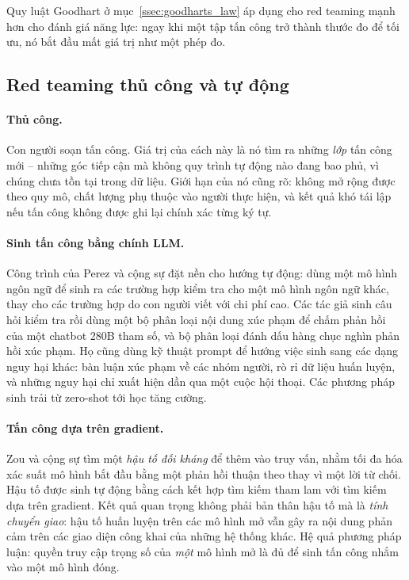 Quy luật Goodhart ở mục~\ref{ssec:goodharts_law} áp dụng cho red teaming mạnh hơn cho đánh giá năng lực: ngay khi một tập tấn công trở thành thước đo để tối ưu, nó bắt đầu mất giá trị như một phép đo.

\subsection{Red teaming thủ công và tự động}
\label{ssec:manual_auto_redteam}

\paragraph{Thủ công.} Con người soạn tấn công. Giá trị của cách này là nó tìm ra những \emph{lớp} tấn công mới -- những góc tiếp cận mà không quy trình tự động nào đang bao phủ, vì chúng chưa tồn tại trong dữ liệu. Giới hạn của nó cũng rõ: không mở rộng được theo quy mô, chất lượng phụ thuộc vào người thực hiện, và kết quả khó tái lập nếu tấn công không được ghi lại chính xác từng ký tự.

\paragraph{Sinh tấn công bằng chính LLM.} Công trình của Perez và cộng sự \cite{perez2022redteaming} đặt nền cho hướng tự động: dùng một mô hình ngôn ngữ để sinh ra các trường hợp kiểm tra cho một mô hình ngôn ngữ khác, thay cho các trường hợp do con người viết với chi phí cao. Các tác giả sinh câu hỏi kiểm tra rồi dùng một bộ phân loại nội dung xúc phạm để chấm phản hồi của một chatbot 280B tham số, và bộ phân loại đánh dấu hàng chục nghìn phản hồi xúc phạm. Họ cũng dùng kỹ thuật prompt để hướng việc sinh sang các dạng nguy hại khác: bàn luận xúc phạm về các nhóm người, rò rỉ dữ liệu huấn luyện, và những nguy hại chỉ xuất hiện dần qua một cuộc hội thoại. Các phương pháp sinh trải từ zero-shot tới học tăng cường.

\paragraph{Tấn công dựa trên gradient.} Zou và cộng sự \cite{zou2023universal} tìm một \emph{hậu tố đối kháng} để thêm vào truy vấn, nhằm tối đa hóa xác suất mô hình bắt đầu bằng một phản hồi thuận theo thay vì một lời từ chối. Hậu tố được sinh tự động bằng cách kết hợp tìm kiếm tham lam với tìm kiếm dựa trên gradient. Kết quả quan trọng không phải bản thân hậu tố mà là \emph{tính chuyển giao}: hậu tố huấn luyện trên các mô hình mở vẫn gây ra nội dung phản cảm trên các giao diện công khai của những hệ thống khác. Hệ quả phương pháp luận: quyền truy cập trọng số của \emph{một} mô hình mở là đủ để sinh tấn công nhắm vào một mô hình đóng.

